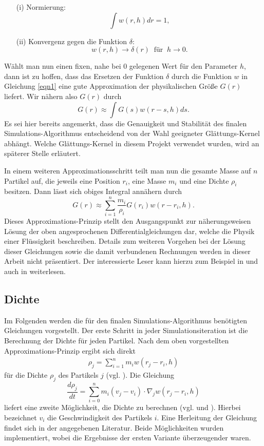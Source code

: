 \begin{enumerate}
\item[(i)] Normierung:
\[
\int w(r,h) dr = 1,
\]
\item[(ii)] Konvergenz gegen die Funktion $\delta$:
\[
w(r,h) \to \delta(r) \ \text{ für } \ h \to 0.
\]
\end{enumerate}
Wählt man nun einen fixen, nahe bei $0$ gelegenen Wert für den Parameter $h$, dann ist zu hoffen, dass das Ersetzen der Funktion $\delta$ durch die Funktion $w$ in Gleichung \ref{eqn1} eine gute Approximation der physikalischen Größe $G(r)$ liefert. Wir nähern also $G(r)$ durch
\[
G(r) \approx \int G(s)w(r - s, h) ds.
\]
Es sei hier bereits angemerkt, dass die Genauigkeit und Stabilität des finalen Simulations-Algorithmus entscheidend von der Wahl geeigneter Glättungs-Kernel abhängt. Welche Glättungs-Kernel in diesem Projekt verwendet wurden, wird an späterer Stelle erläutert.
\medskip

\noindent In einem weiteren Approximationsschritt teilt man nun die gesamte Masse auf $n$ Partikel auf, die jeweils eine Position $r_i$, eine Masse $m_i$ und eine Dichte $\rho_i$ besitzen. Dann lässt sich obiges Integral annähern durch
\[
G(r) \approx \sum_{i=1}^n\frac{m_i}{\rho_i} G(r_i)w(r - r_i, h).
\]
Dieses Approximations-Prinzip stellt den Ausgangspunkt zur näherungsweisen Lösung der oben angesprochenen Differentialgleichungen dar, welche die Physik einer Flüssigkeit beschreiben. Details zum weiteren Vorgehen bei der Lösung dieser Gleichungen sowie die damit verbundenen Rechnungen werden in dieser Arbeit nicht präsentiert. Der interessierte Leser kann hierzu zum Beispiel in \cite{IntroSPH} und auch in \cite{FlowSPH} weiterlesen.


\subsection*{Dichte}
Im Folgenden werden die für den finalen Simulations-Algorithmus benötigten Gleichungen vorgestellt. Der erste Schritt in jeder Simulationsiteration ist die Berechnung der Dichte für jeden Partikel. Nach dem oben vorgestellten Approximations-Prinzip ergibt sich direkt
\begin{align}\label{density}
\rho_j = \sum_{i=1}^n m_i w(r_j - r_i, h)
\end{align}
für die Dichte $\rho_j$ des Partikels $j$ (vgl. \cite[S. 90]{IntroSPH}). Die Gleichung
\[
\frac{d\rho_j}{dt} = \sum_{i = 0}^n m_i (v_j-v_i) \cdot \nabla_j w(r_j - r_i, h)
\]
liefert eine zweite Möglichkeit, die Dichte zu berechnen (vgl. \cite[S. 91]{IntroSPH} und \cite[S. 400]{FlowSPH}). Hierbei bezeichnet $v_i$ die Geschwindigkeit des Partikels $i$. Eine Herleitung der Gleichung findet sich in der angegebenen Literatur. Beide Möglichkeiten wurden implementiert, wobei die Ergebnisse der ersten Variante überzeugender waren.

